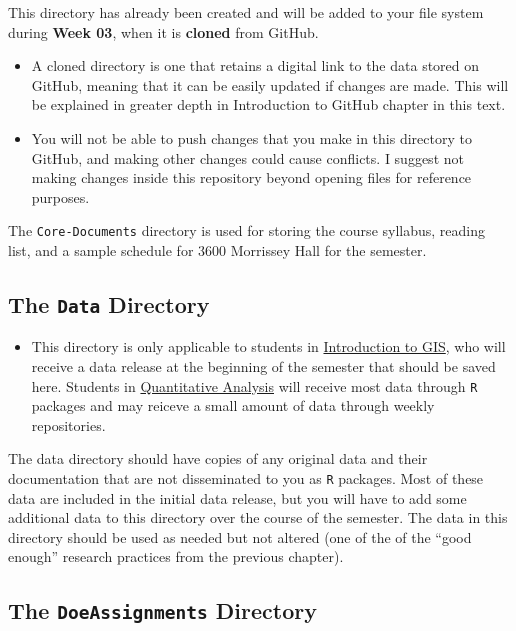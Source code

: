 \documentclass[]{book}
\newenvironment{rmdblock}[1]
  {\begin{shaded*}
  \begin{itemize}
  \renewcommand{\labelitemi}{
    \raisebox{-.7\height}[0pt][0pt]{
      {\setkeys{Gin}{width=3em,keepaspectratio}\texttt{[image: images/\#1]}}
    }
  }
  \item
  }
  {
  \end{itemize}
  \end{shaded*}
  }
\newenvironment{rmdnote}
  {\begin{rmdblock}{note}}
  {\end{rmdblock}}
\newenvironment{rmdwarning}
  {\begin{rmdblock}{warning}}
  {\end{rmdblock}}
\theoremstyle{definition}
\theoremstyle{definition}
\theoremstyle{definition}
\theoremstyle{remark}
\begin{document}
This directory has already been created and will be added to your file
system during \textbf{Week 03}, when it is \textbf{cloned} from GitHub.

\begin{rmdnote}
A cloned directory is one that retains a digital link to the data stored
on GitHub, meaning that it can be easily updated if changes are made.
This will be explained in greater depth in Introduction to GitHub
chapter in this text.
\end{rmdnote}

\begin{rmdwarning}
You will not be able to push changes that you make in this directory to
GitHub, and making other changes could cause conflicts. I suggest not
making changes inside this repository beyond opening files for reference
purposes.
\end{rmdwarning}

The \texttt{Core-Documents} directory is used for storing the course
syllabus, reading list, and a sample schedule for 3600 Morrissey Hall
for the semester.

\subsection{\texorpdfstring{The \texttt{Data}
Directory}{The Data Directory}}\label{the-data-directory}

\begin{rmdwarning}
This directory is only applicable to students in
\href{https://slu-soc5650.github.io}{Introduction to GIS}, who will
receive a data release at the beginning of the semester that should be
saved here. Students in
\href{https://slu-soc5050.github.io}{Quantitative Analysis} will receive
most data through \texttt{R} packages and may reiceve a small amount of
data through weekly repositories.
\end{rmdwarning}

The data directory should have copies of any original data and their
documentation that are not disseminated to you as \texttt{R} packages.
Most of these data are included in the initial data release, but you
will have to add some additional data to this directory over the course
of the semester. The data in this directory should be used as needed but
not altered (one of the of the ``good enough'' research practices from
the previous chapter).

\subsection{\texorpdfstring{The \texttt{DoeAssignments}
Directory}{The DoeAssignments Directory}}\label{the-doeassignments-directory}
\end{document}
